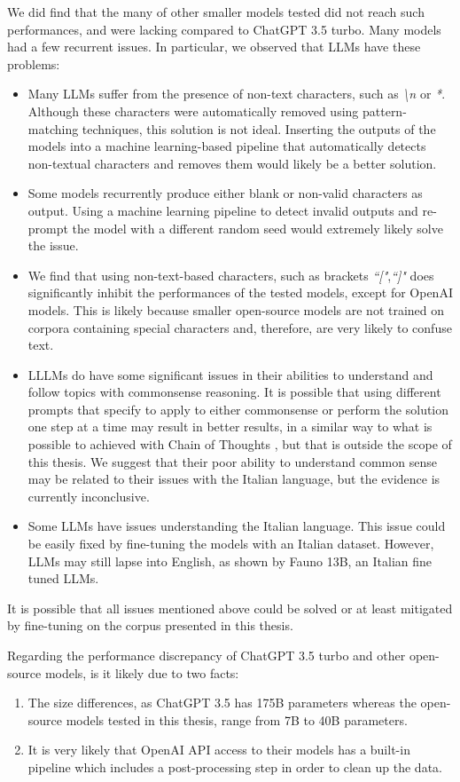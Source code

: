 We did find that the many of other smaller models tested did not reach such performances, and were lacking compared to ChatGPT 3.5 turbo. Many models had a few recurrent issues. In particular, we observed that LLMs have these problems:
\begin{itemize}
    \item Many LLMs suffer from the presence of non-text characters, such as \emph{\textbackslash n} or \emph{*}. Although these characters were automatically removed using pattern-matching techniques, this solution is not ideal. Inserting the outputs of the models into a machine learning-based pipeline that automatically detects non-textual characters and removes them would likely be a better solution.
    \item Some models recurrently produce either blank or non-valid characters as output. Using a machine learning pipeline to detect invalid outputs and re-prompt the model with a different random seed would extremely likely solve the issue.
    \item We find that using non-text-based characters, such as brackets \emph{``["},\emph{``]"} does significantly inhibit the performances of the tested models, except for OpenAI models. This is likely because smaller open-source models are not trained on corpora containing special characters and, therefore, are very likely to confuse text.
    \item LLLMs do have some significant issues in their abilities to understand and follow topics with commonsense reasoning. It is possible that using different prompts that specify to apply to either commonsense or perform the solution one step at a time may result in better results, in a similar way to what is possible to achieved with Chain of Thoughts \cite{wei2023chainofthought}, but that is outside the scope of this thesis. We suggest that their poor ability to understand common sense may be related to their issues with the Italian language, but the evidence is currently inconclusive.
    \item Some LLMs have issues understanding the Italian language. This issue could be easily fixed by fine-tuning the models with an Italian dataset. However, LLMs may still lapse into English, as shown by Fauno 13B, an Italian fine tuned LLMs.
\end{itemize}
It is possible that all issues mentioned above could be solved or at least mitigated by fine-tuning on the corpus presented in this thesis.

Regarding the performance discrepancy of ChatGPT 3.5 turbo and other open-source models, is it likely due to two facts:
\begin{enumerate}
    \item The size differences, as ChatGPT 3.5 has 175B parameters \cite{chatgpt-parameters} whereas the open-source models tested in this thesis, range from 7B to 40B parameters.
    \item It is very likely that OpenAI API access to their models has a built-in pipeline which includes a post-processing step in order to clean up the data.
\end{enumerate}

